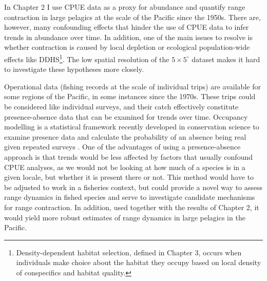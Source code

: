\documentclass{article}
\newcommand{\griddef}[2]{$#1 \times #2^\circ$}
\begin{document}
In Chapter 2 I use CPUE data as a proxy for abundance and
quantify range contraction in large pelagics at the scale of the Pacific
since the 1950s. There are, however, many confounding effects that
hinder the use of CPUE data to infer trends in abundance over time. In
addition, one of the main issues to resolve is whether contraction is
caused by local depletion or ecological population-wide effects like
DDHS\footnote{Density-dependent habitat selection, defined in
  Chapter 3, occurs when individuals make choice about the habitat
  they occupy based on local density of conspecifics and habitat quality.}. The low spatial resolution of the
\griddef{5}{5} dataset makes it hard to investigate these hypotheses
more closely.

Operational data (fishing records at the scale of individual trips)
are available for some regions of the Pacific, in some instances since
the 1970s. These trips could be considered like individual surveys,
and their catch effectively constitute presence-absence data that can
be examined for trends over time. Occupancy modelling is a statistical
framework recently developed in conservation science to examine
presence data and calculate the probability of an absence being real
given repeated surveys \citep{Mackenzie2006_a}. One of the
advantages of using a presence-absence approach is that trends would
be less affected by factors that usually confound CPUE analyses, as we
would not be looking at how much of a species is in a given locale,
but whether it is present there or not. This method would have to be
adjusted to work in a fisheries context, but could provide a novel way
to assess range dynamics in fished species and serve to investigate
candidate mechanisms for range contraction.  In addition,
used together with the results of Chapter 2, it would yield more
robust estimates of range dynamics in large pelagics in the Pacific.






\newpage

\singlespacing
\small


\end{document}
